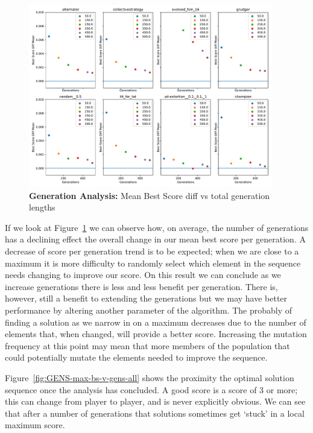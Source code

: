 \begin{figure}[ht]
    \includegraphics[width=0.95\textwidth, keepaspectratio, center]{./img/plots/GENS_mean_bs_diff_v_gens_all.pdf}
    \caption{\textbf{Generation Analysis:} Mean Best Score diff vs total generation lengths}\label{fig:GENS-mean-bs-diff-v-gens-all}
\end{figure}

If we look at Figure~\ref{fig:GENS-mean-bs-diff-v-gens-all} we can observe how, on average, the number of generations has a declining effect the overall change in our mean best score per generation.
A decrease of score per generation trend is to be expected;
when we are close to a maximum it is more difficulty to randomly select which element in the sequence needs changing to improve our score.
On this result we can conclude as we increase generations there is less and less benefit per generation.
There is, however, still a benefit to extending the generations but we may have better performance by altering another parameter of the algorithm.
The probably of finding a solution as we narrow in on a maximum decreases due to the number of elements that, when changed, will provide a better score.
Increasing the mutation frequency at this point may mean that more members of the population that could potentially mutate the elements needed to improve the sequence.

Figure~\ref{fig:GENS-max-bs-v-gens-all} shows the proximity the optimal solution sequence once the analysis has concluded.
A good score is a score of 3 or more;
this can change from player to player, and is never explicitly obvious.
We can see that after a number of generations that solutions sometimes get `stuck' in a local maximum score.

